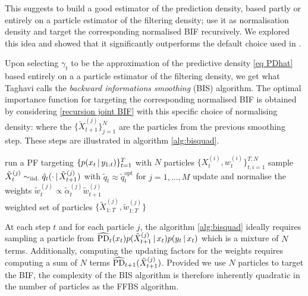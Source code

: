 This suggests to build a good estimator of the prediction density, based partly or entirely on a particle estimator of the filtering density; use it as normalisation density and target the corresponding normalised BIF recursively. 
We explored this idea and showed that it significantly outperforms the default choice used in \citep{briers10, fearnhead10}.

Upon selecting $\gamma_{t}$ to be the approximation of the predictive density \eqref{eq PDhat} based entirely on a a particle estimator of the filtering density, we get what Taghavi calls the \emph{backward informations smoothing} (BIS) algorithm. 
The optimal importance function for targeting the corresponding normalised BIF is obtained by considering \eqref{recursion joint BIF} with this specific choice of normalising density:
where the $\{\tilde X_{t+1}^{(j)}\}_{j=1}^{N}$ are the particles from the previous smoothing step. These steps are illustrated in algorithm \ref{alg:bisquad}.

%
\begin{algorithm}[!h]\small
	\caption{\label{alg:bisquad}}
	\begin{algorithmic}[1]
		\State run a PF targeting $\{p(x_{t}\,|\, y_{1:t})\}_{t=1}^{T}$ with $N$ particles $\{X^{(i)}_{t}, w^{(i)}_{t}\}_{t,i=1}^{T,N}$
			\State sample $\tilde X^{(j)}_{t}\sim_{\mathrm{iid.}} \tilde q_{t}(\cdot\,|\, \tilde X^{(j)}_{t+1})$ with $\tilde q_{t}\approx \tilde q_{t}^{\text{opt}}$ for $j=1,\dots,M$
			\State update and normalise the weights $\tilde w^{(j)}_{t}\propto \tilde\alpha^{(j)}_{t}\tilde w^{(j)}_{t+1}$
		\EndFor\\
		\Return weighted set of particles $\{\tilde X^{(j)}_{1:T}, \tilde w^{(j)}_{1:T}\}$
	\end{algorithmic}
\end{algorithm}
%

At each step $t$ and for each particle $j$, the algorithm \ref{alg:bisquad} ideally requires sampling a particle from $\widehat{\text{PD}}_{t}(x_{t})p(\tilde X^{(j)}_{t+1}\,|\, x_{t})p(y_{t}\,|\, x_{t})$ which is a mixture of $N$ terms. Additionally, computing the updating factors for the weights requires computing a sum of $N$ terms $\widehat{\text{PD}}_{t+1}(\tilde X_{t+1}^{(j)})$. Provided we use $N$ particles to target the BIF, the complexity of the BIS algorithm is therefore inherently quadratic in the number of particles as the FFBS algorithm.

